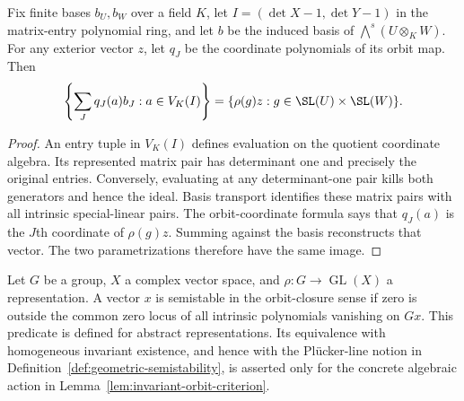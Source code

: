 \begin{lemma}
\label{lem:balanced-polynomial-orbit-image}
\leanok
Fix finite bases $b_U,b_W$ over a field $K$, let
$I=(\det X-1,\det Y-1)$ in the matrix-entry polynomial ring,
and let $b$ be the induced basis of $\bigwedge^s(U\otimes_KW)$.
For any exterior vector $z$, let $q_J$ be the coordinate polynomials
of its orbit map. Then
\[
 \left\{\sum_J q_J(a)b_J : a\in V_K(I)\right\}
   =\{\rho(g)z:g\in\SL(U)\times\SL(W)\}.
\]
\end{lemma}
\begin{proof}
An entry tuple in $V_K(I)$ defines evaluation on the quotient coordinate
algebra. Its represented matrix pair has determinant one and precisely
the original entries. Conversely, evaluating at any determinant-one
pair kills both generators and hence the ideal. Basis transport
identifies these matrix pairs with all intrinsic special-linear pairs.
The orbit-coordinate formula says that $q_J(a)$ is the $J$th
coordinate of $\rho(g)z$. Summing against the basis reconstructs that
vector. The two parametrizations therefore have the same image.
\end{proof}

\begin{definition}
\label{def:balanced-vector-semistability}
\leanok
Let $G$ be a group, $X$ a complex vector space, and
$\rho:G\to\operatorname{GL}(X)$ a representation. A vector $x$ is
semistable in the orbit-closure sense if zero is outside the common
zero locus of all intrinsic polynomials vanishing on $Gx$.
This predicate is defined for abstract representations. Its equivalence
with homogeneous invariant existence, and hence with the Pl\"ucker-line
notion in Definition~\ref{def:geometric-semistability}, is asserted only
for the concrete algebraic action in Lemma~\ref{lem:invariant-orbit-criterion}.
\end{definition}

